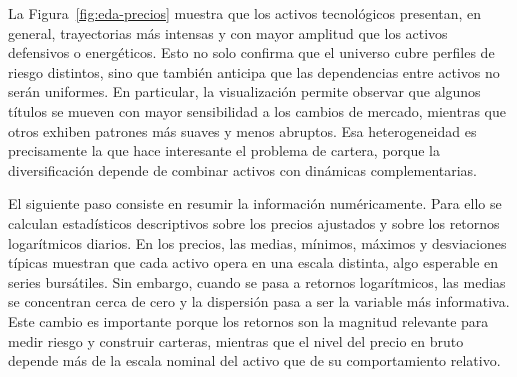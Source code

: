 \documentclass[11pt,a4paper,spanish,oneside]{book}
\numberwithin{equation}{chapter}
\numberwithin{figure}{chapter}
\begin{document}
La Figura~\ref{fig:eda-precios} muestra que los activos tecnológicos presentan, en general, trayectorias más intensas y con mayor amplitud que los activos defensivos o energéticos. Esto no solo confirma que el universo cubre perfiles de riesgo distintos, sino que también anticipa que las dependencias entre activos no serán uniformes. En particular, la visualización permite observar que algunos títulos se mueven con mayor sensibilidad a los cambios de mercado, mientras que otros exhiben patrones más suaves y menos abruptos. Esa heterogeneidad es precisamente la que hace interesante el problema de cartera, porque la diversificación depende de combinar activos con dinámicas complementarias.

El siguiente paso consiste en resumir la información numéricamente. Para ello se calculan estadísticos descriptivos sobre los precios ajustados y sobre los retornos logarítmicos diarios. En los precios, las medias, mínimos, máximos y desviaciones típicas muestran que cada activo opera en una escala distinta, algo esperable en series bursátiles. Sin embargo, cuando se pasa a retornos logarítmicos, las medias se concentran cerca de cero y la dispersión pasa a ser la variable más informativa. Este cambio es importante porque los retornos son la magnitud relevante para medir riesgo y construir carteras, mientras que el nivel del precio en bruto depende más de la escala nominal del activo que de su comportamiento relativo.
\end{document}
